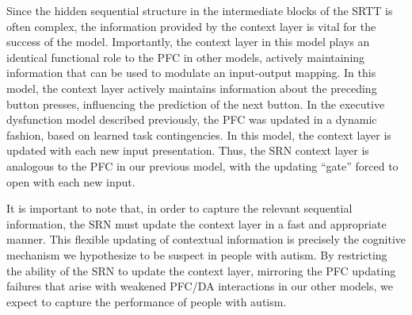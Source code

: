 Since the hidden sequential structure in the intermediate blocks of the SRTT is often complex, the information provided by the context layer is vital for the success of the model.  Importantly, the context layer in this model plays an identical functional role to the PFC in other models, actively maintaining information that can be used to modulate an input-output mapping.  In this model, the context layer actively maintains information about the preceding button presses, influencing the prediction of the next button.  In the executive dysfunction model described previously, the PFC was updated in a dynamic fashion, based on learned task contingencies.  In this model, the context layer is updated with each new input presentation.  Thus, the SRN context layer is analogous to the PFC in our previous model, with the updating ``gate'' forced to open with each new input.%

It is important to note that, in order to capture the relevant sequential information, the SRN must update the context layer in a fast and appropriate manner.  This flexible updating of contextual information is precisely the cognitive mechanism we hypothesize to be suspect in people with autism.  By restricting the ability of the SRN to update the context layer, mirroring the PFC updating failures that arise with weakened PFC/DA interactions in our other models, we expect to capture the performance of people with autism.

